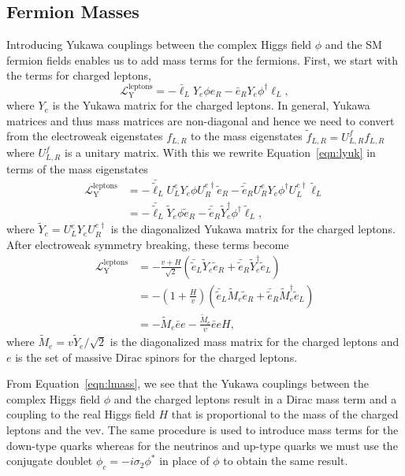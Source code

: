 \newpage

\subsection{Fermion Masses}
\label{subsec:yukawa}

Introducing Yukawa couplings between the complex Higgs field $\phi$ and the SM fermion fields enables us to add mass terms for the fermions.
First, we start with the terms for charged leptons,
\begin{equation}
  \label{eqn:lyuk}
  \mathcal{L}^{\text{leptons}}_{\text{Y}} = - \bar \ell_L Y_e \phi e_R - \bar e_R Y_e \phi^\dagger \ell_L,
\end{equation}
where $Y_e$ is the Yukawa matrix for the charged leptons.
In general, Yukawa matrices and thus mass matrices are non-diagonal and hence we need to convert from the electroweak eigenstates $f_{L,R}$ to the mass eigenstates $\tilde{f}_{L,R} = U^{f}_{L,R} f_{L,R}$ where $U^{f}_{L,R}$ is a unitary matrix.
With this we rewrite Equation~\ref{eqn:lyuk} in terms of the mass eigenstates
\begin{align}
  \mathcal{L}^{\text{leptons}}_{\text{Y}} & = - \bar{\tilde{\ell}}_{L} U^e_L Y_e \phi U^{e\dagger}_R \tilde{e}_{R} - \bar{\tilde{e}}_{R} U^e_R Y_e \phi^\dagger U^{e\dagger}_L \tilde{\ell}_{L} \\
  & = - \bar{\tilde{\ell}}_{L} \tilde Y_e \phi \tilde{e}_{R} - \bar{\tilde{e}}_{R} \tilde Y_e^\dagger \phi^\dagger \tilde{\ell}_{L}, 
\end{align}
where $\tilde Y_e = U^e_L Y_e U^{e\dagger}_R$ is the diagonalized Yukawa matrix for the charged leptons.
After electroweak symmetry breaking, these terms become
\begin{align}
  \mathcal{L}^{\text{leptons}}_{\text{Y}} & = - \frac{v + H}{\sqrt{2}} \left( \bar{\tilde{e}}_L \tilde Y_e  \tilde{e}_R + \bar{\tilde{e}}_R \tilde Y_e^\dagger \tilde{e}_L \right) \\
  & = - \left(1 + \frac{H}{v}\right) \left( \bar{\tilde{e}}_L \tilde M_e \tilde{e}_R + \bar{\tilde{e}}_R \tilde M_e^\dagger \tilde{e}_L \right)\\
  & = - \tilde M_e \bar e e - \frac{\tilde M_e}{v} \bar e e H,
    \label{eqn:lmass}
\end{align}
where $\tilde M_e = v \tilde Y_e / \sqrt{2}$ is the diagonalized mass matrix for the charged leptons and $e$ is the set of massive Dirac spinors for the charged leptons.

From Equation~\ref{eqn:lmass}, we see that the Yukawa couplings between the complex Higgs field $\phi$ and the charged leptons result in a Dirac mass term and a coupling to the real Higgs field $H$ that is proportional to the mass of the charged leptons and the vev.
The same procedure is used to introduce mass terms for the down-type quarks whereas for the neutrinos and up-type quarks we must use the conjugate doublet $\phi_c = - i \sigma_2 \phi^*$ in place of $\phi$ to obtain the same result.

